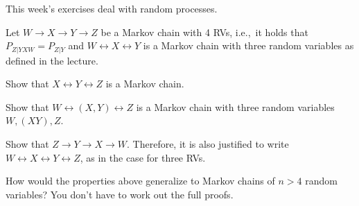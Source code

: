 \documentclass[a4paper,10pt,landscape,twocolumn]{scrartcl}
\begin{document}
\practiceproblems

{\sffamily\noindent
This week's exercises deal with random processes. \practiceinstructions
}

\begin{exercise}
Let $W \rightarrow X \rightarrow Y \rightarrow Z$ be a Markov chain with 4 RVs, i.e.,\ it holds that $P_{Z|YXW} = P_{Z|Y}$ and $W \leftrightarrow X \leftrightarrow Y$ is a Markov chain with three random variables as defined in the lecture.
\begin{subex}
	Show that $X \leftrightarrow Y \leftrightarrow Z$ is a Markov chain.
\end{subex}
\begin{subex}
Show that $W \leftrightarrow (X,Y) \leftrightarrow Z$ is a Markov chain with three random variables $W, (XY), Z$.
\end{subex}
\begin{subex}
Show that $Z \rightarrow Y \rightarrow X \rightarrow W$. Therefore, it is also justified to write $W \leftrightarrow X \leftrightarrow Y \leftrightarrow Z$, as in the case for three RVs.
\end{subex}
\begin{subex**}
How would the properties above generalize to Markov chains of $n>4$
random variables? You don't have to work out the full proofs.
\end{subex**}
\end{exercise}




\end{document}
